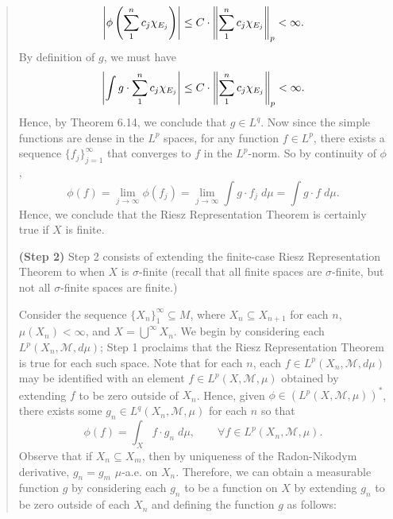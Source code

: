 \documentclass{article}
\begin{document}
\begin{itemize}
\begin{quote}
\begin{solutions}
\begin{enumerate}[itemsep =-2pt,label = (\arabic{*})]
		\begin{equation}
			\left| \phi\left(\sum_{1}^{n}c_{j}\chi_{E_{j}}\right) \right| \leq C \cdot \left\Vert \sum_{1}^{n}c_{j}\chi_{E_{j}} \right\Vert_{p} < \infty. 
		\end{equation}
	By definition of $g$, we must have 
	\begin{equation}
		\left| \int g \cdot \sum_{1}^{n}c_{j}\chi_{E_{j}} \right| \leq C \cdot \left\Vert \sum_{1}^{n}c_{j}\chi_{E_{j}} \right\Vert_{p} < \infty. 
	\end{equation}
	Hence, by Theorem 6.14, we conclude that $g \in L^{q}$. Now since the simple functions are dense in the $L^{p}$ spaces, for any function $f \in L^{p}$, there exists a sequence $\{f_{j}\}_{j = 1}^{\infty}$ that converges to $f$ in the $L^{p}$-norm. So by continuity of $\phi$, 
	\begin{equation}
		\phi(f) = \lim_{j \to \infty}\phi(f_{j}) = \lim_{j \to \infty}\int g \cdot f_{j}\;d\mu = \int g \cdot f\;d\mu. 
	\end{equation}
	Hence, we conclude that the Riesz Representation Theorem is certainly true if $X$ is finite. 
	\end{enumerate}
\end{solutions}
	\textbf{(Step 2)} Step 2 consists of extending the finite-case Riesz Representation Theorem to when $X$ is $\sigma$-finite (recall that all finite spaces are $\sigma$-finite, but not all $\sigma$-finite spaces are finite.) \newline 
	\begin{solutions} 
	Consider the sequence $\{X_{n}\}_{1}^{\infty}\subseteq M$, where $X_{n} \subseteq X_{n +1}$ for each $n$, $\mu(X_{n}) < \infty$, and $X = \bigcup^{\infty}X_{n}$. We begin by considering each $L^{p}(X_{n}, \mathscr{M}, d\mu)$; Step 1 proclaims that the Riesz Representation Theorem is true for each such space. Note that for each $n$, each $f \in L^{p}(X_{n}, \mathscr{M}, d\mu)$ may be identified with an element $f \in L^{p}(X, \mathscr{M}, \mu)$ obtained by extending $f$ to be zero outside of $X_{n}$. Hence, given $\phi \in (L^{p}(X, \mathscr{M}, \mu))^{\ast}$, there exists some $g_{n} \in L^{q}(X_{n}, \mathscr{M}, \mu)$ for each $n$ so that 
		\begin{equation}
			\phi(f) = \int_{X}f \cdot g_{n}\;d\mu, \qquad \forall f \in L^{p}(X_{n}, \mathscr{M}, \mu). 
		\end{equation}
	Observe that if $X_{n} \subseteq X_{m}$, then by uniqueness of the Radon-Nikodym derivative, $g_{n} = g_{m}$ $\mu$-a.e. on $X_{n}$. Therefore, we can obtain a measurable function $g$ by considering each $g_{n}$ to be a function on $X$ by extending $g_{n}$ to be zero outside of each $X_{n}$ and defining the function $g$ as follows: 

\end{solutions}
\end{quote}
\end{itemize}
\end{document}

